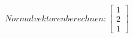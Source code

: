 \documentclass[preview]{standalone}
\begin{document}
\begin{center}
$Normalvektoren berechnen: \begin{bmatrix} 1 \\ 2 \\ 1 \end{bmatrix}$
\end{center}
\end{document}
